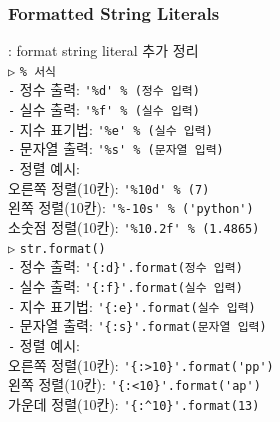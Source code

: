 \documentclass[11pt,a4paper]{article}
\begin{document}
\subsubsection{\Large\textbf{Formatted String Literals}}
\begin{spacing}{1.5}
: format string literal 추가 정리\\
\texttt{▷} \verb|% 서식|\\
\hspace*{1em}\texttt{-} 정수 출력: \verb|'%d' % (정수 입력)|\\
\hspace*{1em}\texttt{-} 실수 출력: \verb|'%f' % (실수 입력)|\\
\hspace*{1em}\texttt{-} 지수 표기법: \verb|'%e' % (실수 입력)|\\
\hspace*{1em}\texttt{-} 문자열 출력: \verb|'%s' % (문자열 입력)|\\
\hspace*{1em}\texttt{-} 정렬 예시:\\
\hspace*{4em}오른쪽 정렬(10칸): \verb|'%10d' % (7)|\\
\hspace*{4em}왼쪽 정렬(10칸): \verb|'%-10s' % ('python')|\\
\hspace*{4em}소숫점 정렬(10칸): \verb|'%10.2f' % (1.4865)|\\

\texttt{▷} \verb|str.format()|\\
\hspace*{1em}\texttt{-} 정수 출력: \verb|'{:d}'.format(정수 입력)|\\
\hspace*{1em}\texttt{-} 실수 출력: \verb|'{:f}'.format(실수 입력)|\\
\hspace*{1em}\texttt{-} 지수 표기법: \verb|'{:e}'.format(실수 입력)|\\
\hspace*{1em}\texttt{-} 문자열 출력: \verb|'{:s}'.format(문자열 입력)|\\
\hspace*{1em}\texttt{-} 정렬 예시:\\
\hspace*{4em}오른쪽 정렬(10칸): \verb|'{:>10}'.format('pp')|\\
\hspace*{4em}왼쪽 정렬(10칸): \verb|'{:<10}'.format('ap')|\\
\hspace*{4em}가운데 정렬(10칸): \verb|'{:^10}'.format(13)|\\


\end{spacing}
\end{document}
